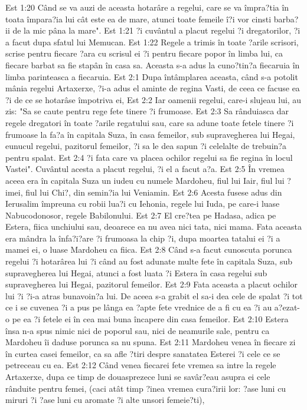 Est 1:20  Când se va auzi de aceasta hotarâre a regelui, care se va împra?tia în toata împara?ia lui cât este ea de mare, atunci toate femeile î?i vor cinsti barba?ii de la mic pâna la mare".
Est 1:21  ?i cuvântul a placut regelui ?i dregatorilor, ?i a facut dupa sfatul lui Memucan.
Est 1:22  Regele a trimis în toate ?arile scrisori, scrise pentru fiecare ?ara cu scrisul ei ?i pentru fiecare popor în limba lui, ca fiecare barbat sa fie stapân în casa sa. Aceasta s-a adus la cuno?tin?a fiecaruia în limba parinteasca a fiecaruia.
Est 2:1  Dupa întâmplarea aceasta, când s-a potolit mânia regelui Artaxerxe, ?i-a adus el aminte de regina Vasti, de ceea ce facuse ea ?i de ce se hotarâse împotriva ei,
Est 2:2  Iar oamenii regelui, care-i slujeau lui, au zis: "Sa se caute pentru rege fete tinere ?i frumoase.
Est 2:3  Sa rânduiasca dar regele dregatori în toate ?arile regatului sau, care sa adune toate fetele tinere ?i frumoase la fa?a în capitala Suza, în casa femeilor, sub supravegherea lui Hegai, eunucul regelui, pazitorul femeilor, ?i sa le dea sapun ?i celelalte de trebuin?a pentru spalat.
Est 2:4  ?i fata care va placea ochilor regelui sa fie regina în locul Vastei". Cuvântul acesta a placut regelui, ?i el a facut a?a.
Est 2:5  În vremea aceea era în capitala Suza un iudeu cu numele Mardoheu, fiul lui Iair, fiul lui ?imei, fiul lui Chi?, din semin?ia lui Veniamin.
Est 2:6  Acesta fusese adus din Ierusalim împreuna cu robii lua?i cu Iehonia, regele lui Iuda, pe care-i luase Nabucodonosor, regele Babilonului.
Est 2:7  El cre?tea pe Hadasa, adica pe Estera, fiica unchiului sau, deoarece ea nu avea nici tata, nici mama. Fata aceasta era mândra la înfa?i?are ?i frumoasa la chip ?i, dupa moartea tatalui ei ?i a mamei ei, o luase Mardoheu ca fiica.
Est 2:8  Când s-a facut cunoscuta porunca regelui ?i hotarârea lui ?i când au fost adunate multe fete în capitala Suza, sub supravegherea lui Hegai, atunci a fost luata ?i Estera în casa regelui sub supravegherea lui Hegai, pazitorul femeilor.
Est 2:9  Fata aceasta a placut ochilor lui ?i ?i-a atras bunavoin?a lui. De aceea s-a grabit el sa-i dea cele de spalat ?i tot ce i se cuvenea ?i a pus pe lânga ea ?apte fete vrednice de a fi cu ea ?i au a?ezat-o pe ea ?i fetele ei în cea mai buna încapere din casa femeilor.
Est 2:10  Estera însa n-a spus nimic nici de poporul sau, nici de neamurile sale, pentru ca Mardoheu îi daduse porunca sa nu spuna.
Est 2:11  Mardoheu venea în fiecare zi în curtea casei femeilor, ca sa afle ?tiri despre sanatatea Esterei ?i cele ce se petreceau cu ea.
Est 2:12  Când venea fiecarei fete vremea sa intre la regele Artaxerxe, dupa ce timp de douasprezece luni se savâr?eau asupra ei cele rânduite pentru femei, (caci atât timp ?inea vremea cura?irii lor: ?ase luni cu miruri ?i ?ase luni cu aromate ?i alte unsori femeie?ti),
